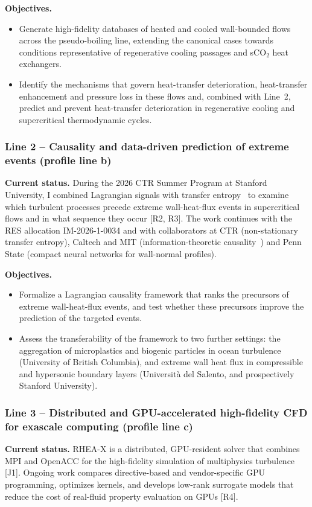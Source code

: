 \documentclass[11pt]{article}
\begin{document}
\textbf{Objectives.}
\begin{itemize}
  \item[\textbf{O1.}] Generate high-fidelity databases of heated and cooled wall-bounded
  flows across the pseudo-boiling line, extending the canonical cases towards conditions
  representative of regenerative cooling passages and sCO$_2$ heat exchangers.
  \item[\textbf{O2.}] Identify the mechanisms that govern heat-transfer deterioration,
  heat-transfer enhancement and pressure loss in these flows and, combined with Line~2,
  predict and prevent heat-transfer deterioration in regenerative cooling and supercritical
  thermodynamic cycles.
\end{itemize}

\subsubsection*{Line 2 -- Causality and data-driven prediction of extreme events (profile
line b)}
\textbf{Current status.} During the 2026 CTR Summer Program at Stanford University, I
combined Lagrangian signals with transfer entropy~\cite{Schreiber2000} to examine which
turbulent processes precede extreme wall-heat-flux events in supercritical flows and in
what sequence they occur [R2, R3]. The work continues with the RES allocation
IM-2026-1-0034 and with collaborators at CTR (non-stationary transfer entropy), Caltech
and MIT (information-theoretic causality~\cite{LozanoDuranArranz2022,MartinezSanchez2024})
and Penn State (compact neural networks for wall-normal profiles).

\textbf{Objectives.}
\begin{itemize}
  \item[\textbf{O3.}] Formalize a Lagrangian causality framework that ranks the
  precursors of extreme wall-heat-flux events, and test whether these precursors improve
  the prediction of the targeted events.
  \item[\textbf{O4.}] Assess the transferability of the framework to two further
  settings: the aggregation of microplastics and biogenic particles in ocean
  turbulence~\cite{vanSebille2020} (University of British Columbia), and extreme wall heat
  flux in compressible and hypersonic boundary layers (Universit\`a del Salento, and
  prospectively Stanford University).
\end{itemize}

\subsubsection*{Line 3 -- Distributed and GPU-accelerated high-fidelity CFD for exascale
computing (profile line c)}
\textbf{Current status.} RHEA-X is a distributed, GPU-resident solver that combines MPI
and OpenACC for the high-fidelity simulation of multiphysics turbulence [J1]. Ongoing work
compares directive-based and vendor-specific GPU programming, optimizes kernels, and
develops low-rank surrogate models that reduce the cost of real-fluid property evaluation
on GPUs [R4].
\end{document}
